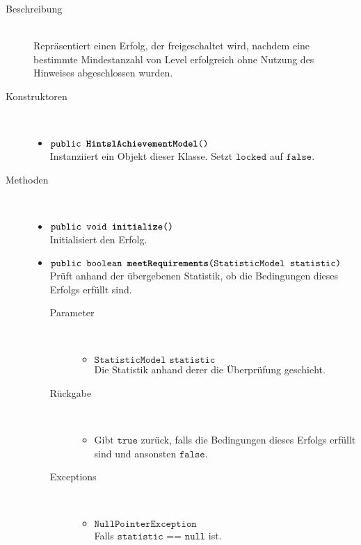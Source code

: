 		\begin{description}
		\item[Beschreibung] \hfill \\ Repräsentiert einen Erfolg, der freigeschaltet wird, nachdem eine bestimmte Mindestanzahl von Level erfolgreich ohne Nutzung des Hinweises abgeschlossen wurden.
			
		\item[Konstruktoren] \hfill \\
			\vspace{-.8cm}
			\begin{itemize}
				\item $\texttt{public \textbf{HintslAchievementModel}()}$ \\ Instanziiert ein Objekt dieser Klasse. Setzt $\texttt{locked}$ auf $\texttt{false}$.
			\end{itemize}
			
		\item[Methoden] \hfill \\
			\vspace{-.8cm}
			\begin{itemize}
				\item $\texttt{public void \textbf{initialize}()}$ \\ Initialisiert den Erfolg.
				
				\item $\texttt{public boolean \textbf{meetRequirements}(StatisticModel statistic)}$ \\ Prüft anhand der übergebenen Statistik, ob die Bedingungen dieses Erfolgs erfüllt sind.
				\begin{description}
				\item[Parameter] \hfill \\
					\vspace{-.8cm}
					\begin{itemize}
						\item $\texttt{StatisticModel statistic}$ \\ Die Statistik anhand derer die Überprüfung geschieht. 
					\end{itemize}
					\item[Rückgabe] \hfill \\
					\vspace{-.8cm}
					\begin{itemize}
						\item Gibt $\texttt{true}$ zurück, falls die Bedingungen dieses Erfolgs erfüllt sind und ansonsten $\texttt{false}$.
					\end{itemize}
					\item[Exceptions] \hfill \\
					\vspace{-.8cm}
					\begin{itemize}
						\item $\texttt{NullPointerException}$ \\ Falls $\texttt{statistic == null}$ ist.
					\end{itemize}
				\end{description}
				
			\end{itemize}
		\end{description}
		
